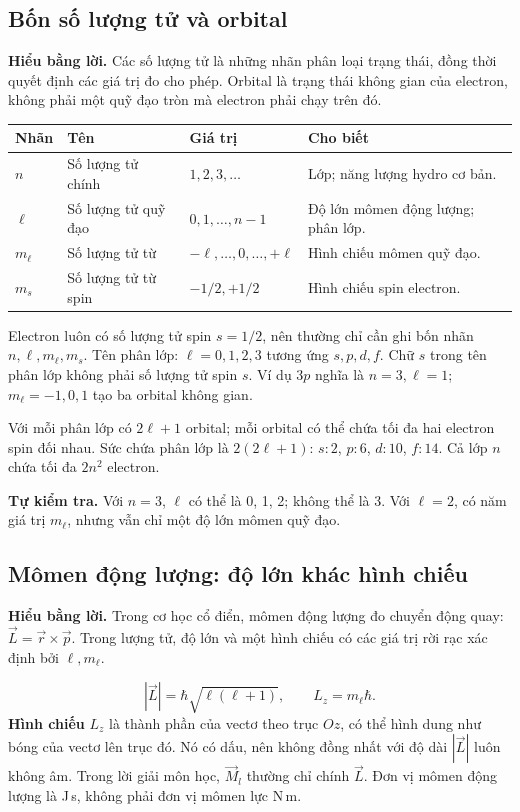 \documentclass[11pt,a4paper]{article}
\newcommand{\idea}[1]{\par\textbf{Hiểu bằng lời.} #1\par}
\newcommand{\checkit}[1]{\par\textbf{Tự kiểm tra.} #1\par}
\begin{document}
\subsection{Bốn số lượng tử và orbital}\label{sec:qn}
\idea{Các số lượng tử là những nhãn phân loại trạng thái, đồng thời quyết
định các giá trị đo cho phép. Orbital là trạng thái không gian của electron,
không phải một quỹ đạo tròn mà electron phải chạy trên đó.}
\begin{tabularx}{\textwidth}{@{}Q{1.5cm}Q{3.5cm}Q{3.5cm}Y@{}}
\toprule
\textbf{Nhãn} & \textbf{Tên} & \textbf{Giá trị} & \textbf{Cho biết}\\\midrule
$n$ & Số lượng tử chính & $1,2,3,\ldots$ & Lớp; năng lượng hydro cơ bản.\\
$\ell$ & Số lượng tử quỹ đạo & $0,1,\ldots,n-1$ & Độ lớn mômen động lượng; phân lớp.\\
$m_\ell$ & Số lượng tử từ & $-\ell,\ldots,0,\ldots,+\ell$ & Hình chiếu mômen quỹ đạo.\\
$m_s$ & Số lượng tử từ spin & $-1/2,+1/2$ & Hình chiếu spin electron.\\
\bottomrule
\end{tabularx}

Electron luôn có số lượng tử spin $s=1/2$, nên thường chỉ cần ghi
bốn nhãn $n,\ell,m_\ell,m_s$.
Tên phân lớp: $\ell=0,1,2,3$ tương ứng $s,p,d,f$.
Chữ $s$ trong tên phân lớp không phải số lượng tử spin $s$.
Ví dụ $3p$ nghĩa là $n=3,\ell=1$; $m_\ell=-1,0,1$ tạo ba orbital không gian.

Với mỗi phân lớp có $2\ell+1$ orbital; mỗi orbital có thể chứa tối đa hai
electron spin đối nhau. Sức chứa phân lớp là $2(2\ell+1)$:
$s:2$, $p:6$, $d:10$, $f:14$. Cả lớp $n$ chứa tối đa $2n^2$ electron.

\checkit{Với $n=3$, $\ell$ có thể là 0, 1, 2; không thể là 3.
Với $\ell=2$, có năm giá trị $m_\ell$, nhưng vẫn chỉ một độ lớn mômen quỹ đạo.}

\subsection{Mômen động lượng: độ lớn khác hình chiếu}\label{sec:angular}
\idea{Trong cơ học cổ điển, mômen động lượng đo chuyển động quay:
$\vec L=\vec r\times\vec p$. Trong lượng tử, độ lớn và một hình chiếu có
các giá trị rời rạc xác định bởi $\ell,m_\ell$.}
\[
|\vec L|=\hbar\sqrt{\ell(\ell+1)},\qquad L_z=m_\ell\hbar.
\]
\textbf{Hình chiếu} $L_z$ là thành phần của vectơ theo trục $Oz$, có thể
hình dung như bóng của vectơ lên trục đó. Nó có dấu, nên không đồng nhất
với độ dài $|\vec L|$ luôn không âm.
Trong lời giải môn học, $\vec M_l$ thường chỉ chính $\vec L$.
Đơn vị mômen động lượng là J\,s, không phải đơn vị mômen lực N\,m.
\end{document}
